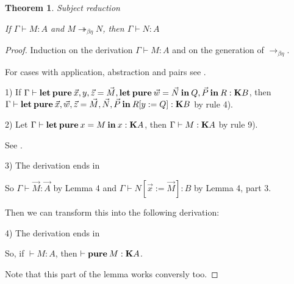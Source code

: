 \documentclass[a4paper]{article}
\newtheorem{theorem}{Theorem}
\begin{document}
\begin{theorem} Subject reduction

  If $\Gamma \vdash M : A$ and $M \twoheadrightarrow_{\beta \eta} N$, then $\Gamma \vdash N : A$

\end{theorem}

\begin{proof}

Induction on the derivation $\Gamma \vdash M : A$ and on the generation of $\rightarrow_{\beta \eta}$.

For cases with application, abstraction and pairs see \cite{Morten} \cite{Pierce}.

1) If $\Gamma \vdash {\bf let \: pure \:} \vec{x}, y, \vec{z} = \vec{M}, {\bf let \: pure \: } \vec{w} = \vec{N} {\bf \: in \: } Q, \vec{P}  {\: \bf in \:} R : {\bf K}B$,
  then $\Gamma \vdash {\bf let \: pure \:} \vec{x}, \vec{w}, \vec{z} = \vec{M}, \vec{N}, \vec{P} \: { \bf in } \: R [y := Q] : {\bf K}B$ by rule 4).

2) Let $\Gamma \vdash {\bf let \: pure \:} x = M {\: \bf in \: } x : {\bf K}A$, then $\Gamma \vdash M : {\bf K}A$ by rule 9).

See \cite{ModalK}.

3) The derivation ends in

\begin{prooftree}
\end{prooftree}

So $\Gamma \vdash \vec{M} : \vec{A}$ by Lemma 4 and $\Gamma \vdash N [\vec{x} := \vec{M}] : B$ by Lemma 4, part 3.

Then we can transform this into the following derivation:

\begin{prooftree}
\end{prooftree}

4) The derivation ends in

\begin{prooftree}
\end{prooftree}

So, if $\vdash M : A$, then $\vdash {\bf pure \:} M : {\bf K}A$.

Note that this part of the lemma works conversly too.
\end{proof}
\end{document}

